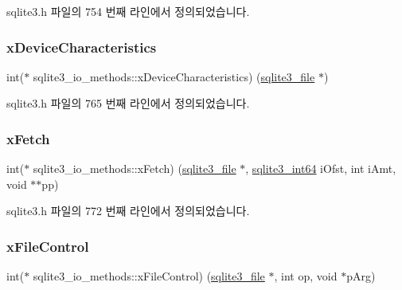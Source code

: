 sqlite3.\+h 파일의 754 번째 라인에서 정의되었습니다.

\mbox{\label{structsqlite3__io__methods_abbf1b4769c310bfee517af815eed93e9}} 
\subsubsection{\texorpdfstring{x\+Device\+Characteristics}{xDeviceCharacteristics}}
{\footnotesize\ttfamily int($\ast$ sqlite3\+\_\+io\+\_\+methods\+::x\+Device\+Characteristics) (\hyperlink{structsqlite3__file}{sqlite3\+\_\+file} $\ast$)}



sqlite3.\+h 파일의 765 번째 라인에서 정의되었습니다.

\mbox{\label{structsqlite3__io__methods_a71e611fc755d95ffbd3e7ecb8cb5fae6}} 
\subsubsection{\texorpdfstring{x\+Fetch}{xFetch}}
{\footnotesize\ttfamily int($\ast$ sqlite3\+\_\+io\+\_\+methods\+::x\+Fetch) (\hyperlink{structsqlite3__file}{sqlite3\+\_\+file} $\ast$, \hyperlink{sqlite3_8h_a0a4d3e6c1ad46f90e746b920ab6ca0d2}{sqlite3\+\_\+int64} i\+Ofst, int i\+Amt, void $\ast$$\ast$pp)}



sqlite3.\+h 파일의 772 번째 라인에서 정의되었습니다.

\mbox{\label{structsqlite3__io__methods_a913b12deb1dcae2c61b90776bcd9d19c}} 
\subsubsection{\texorpdfstring{x\+File\+Control}{xFileControl}}
{\footnotesize\ttfamily int($\ast$ sqlite3\+\_\+io\+\_\+methods\+::x\+File\+Control) (\hyperlink{structsqlite3__file}{sqlite3\+\_\+file} $\ast$, int op, void $\ast$p\+Arg)}



